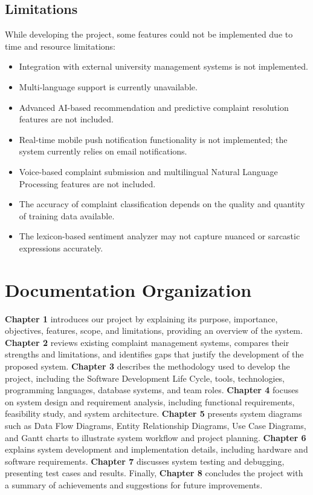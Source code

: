 \documentclass[12pt,a4paper]{report}
\begin{document}
\subsection{Limitations}
While developing the project, some features could not be implemented due to time and resource limitations:
\begin{itemize}[nolistsep]
    \item Integration with external university management systems is not implemented.
    \item Multi-language support is currently unavailable.
    \item Advanced AI-based recommendation and predictive complaint resolution features are not included.
    \item Real-time mobile push notification functionality is not implemented; the system currently relies on email notifications.
    \item Voice-based complaint submission and multilingual Natural Language Processing features are not included.
    \item The accuracy of complaint classification depends on the quality and quantity of training data available.
    \item The lexicon-based sentiment analyzer may not capture nuanced or sarcastic expressions accurately.
\end{itemize}

\section{Documentation Organization}
\textbf{Chapter 1} introduces our project by explaining its purpose, importance, objectives, features, scope, and limitations, providing an overview of the system. \textbf{Chapter 2} reviews existing complaint management systems, compares their strengths and limitations, and identifies gaps that justify the development of the proposed system. \textbf{Chapter 3} describes the methodology used to develop the project, including the Software Development Life Cycle, tools, technologies, programming languages, database systems, and team roles. \textbf{Chapter 4} focuses on system design and requirement analysis, including functional requirements, feasibility study, and system architecture. \textbf{Chapter 5} presents system diagrams such as Data Flow Diagrams, Entity Relationship Diagrams, Use Case Diagrams, and Gantt charts to illustrate system workflow and project planning. \textbf{Chapter 6} explains system development and implementation details, including hardware and software requirements. \textbf{Chapter 7} discusses system testing and debugging, presenting test cases and results. Finally, \textbf{Chapter 8} concludes the project with a summary of achievements and suggestions for future improvements.
\end{document}
